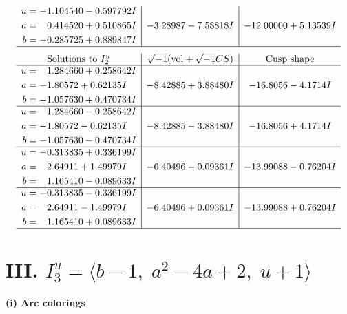 \documentclass[1p]{elsarticle_modified}
\theoremstyle{definition}
\newcommand{\I}{\sqrt{-1}}
\begin{document}
$$\begin{array}{c|c|c}
\begin{aligned}
u &= -1.104540 - 0.597792 I \\
a &= \phantom{-}0.414520 + 0.510865 I \\
b &= -0.285725 + 0.889847 I\end{aligned}
 & -3.28987 - 7.58818 I & -12.00000 + 5.13539 I\\
 \hline 
 \end{array}$$\newpage$$\begin{array}{c|c|c}  
\text{Solutions to }I^u_{2}& \I (\text{vol} + \sqrt{-1}CS) & \text{Cusp shape}\\
 \hline 
\begin{aligned}
u &= \phantom{-}1.284660 + 0.258642 I \\
a &= -1.80572 + 0.62135 I \\
b &= -1.057630 + 0.470734 I\end{aligned}
 & -8.42885 + 3.88480 I & -16.8056 - 4.1714 I \\ \hline\begin{aligned}
u &= \phantom{-}1.284660 - 0.258642 I \\
a &= -1.80572 - 0.62135 I \\
b &= -1.057630 - 0.470734 I\end{aligned}
 & -8.42885 - 3.88480 I & -16.8056 + 4.1714 I \\ \hline\begin{aligned}
u &= -0.313835 + 0.336199 I \\
a &= \phantom{-}2.64911 + 1.49979 I \\
b &= \phantom{-}1.165410 - 0.089633 I\end{aligned}
 & -6.40496 - 0.09361 I & -13.99088 - 0.76204 I \\ \hline\begin{aligned}
u &= -0.313835 - 0.336199 I \\
a &= \phantom{-}2.64911 - 1.49979 I \\
b &= \phantom{-}1.165410 + 0.089633 I\end{aligned}
 & -6.40496 + 0.09361 I & -13.99088 + 0.76204 I\\
 \hline 
 \end{array}$$\newpage\newpage\renewcommand{\arraystretch}{1}
\centering \section*{III. $I^u_{3}= \langle b-1,\;a^2-4 a+2,\;u+1 \rangle$}
\flushleft \textbf{(i) Arc colorings}\\
\end{document}
